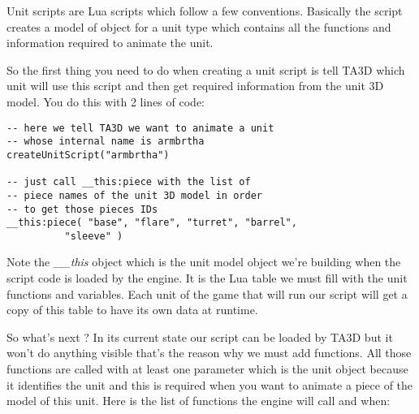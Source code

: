 \documentclass[a4paper,10pt]{article}
\begin{document}
Unit scripts are Lua scripts which follow a few conventions. Basically the script creates a model of object for a unit type which contains all the functions and information required to animate the unit.

So the first thing you need to do when creating a unit script is tell TA3D which unit will use this script and then get required information from the unit 3D model. You do this with 2 lines of code:
\begin{lstlisting}
-- here we tell TA3D we want to animate a unit
-- whose internal name is armbrtha
createUnitScript("armbrtha")

-- just call __this:piece with the list of
-- piece names of the unit 3D model in order
-- to get those pieces IDs
__this:piece( "base", "flare", "turret", "barrel",
	      "sleeve" )
\end{lstlisting}

Note the \emph{\_\_this} object which is the unit model object we're building when the script code is loaded by the engine. It is the Lua table we must fill with the unit functions and variables. Each unit of the game that will run our script will get a copy of this table to have its own data at runtime.


So what's next ? In its current state our script can be loaded by TA3D but it won't do anything visible that's the reason why we must add functions. All those functions are called with at least one parameter which is the unit object because it identifies the unit and this is required when you want to animate a piece of the model of this unit. Here is the list of functions the engine will call and when:
\end{document}
